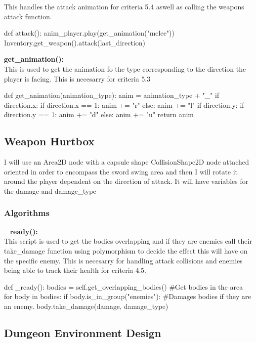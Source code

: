 \documentclass{article}
\begin{document}
        This handles the attack animation for criteria 5.4 aswell as calling the weapons attack function.\\
        \begin{python}
def attack():
   anim_player.play(get_animation("melee"))
   Inventory.get_weapon().attack(last_direction)
        \end{python}
        \textbf{get\_animation():}\\
        This is used to get the animation fo the type corresponding to the direction the player is facing. This is necesarry for criteria 5.3\\
        \begin{python}
def get_animation(animation_type):
   anim = animation_type + "_"
   if direction.x:
      if direction.x == 1:
         anim += "r"
      else:
         anim += "l"
   if direction.y:
      if direction.y == 1:
         anim += "d"
      else:
         anim += "u"
   return anim
        \end{python}
        \subsection{Weapon Hurtbox}
        I will use an Area2D node with a capsule shape CollisionShape2D node attached oriented in order to encompass the sword swing area and then I will rotate it around the player dependent on the direction of attack. It will have variables for the damage and damage\_type\\
        \subsubsection{Algorithms}
        \textbf{\_ready():}\\
        This script is used to get the bodies overlapping and if they are enemies call their take\_damage function using polymorphism to decide the effect this will have on the specific enemy. This is necesarry for handling attack collisions and enemies being able to track their health for criteria 4.5.\\ 
        \begin{python}
def _ready():
   bodies = self.get_overlapping_bodies() #Get bodies in the area
   for body in bodies:
      if body.is_in_group("enemies"): #Damages bodies if they are an enemy.
         body.take_damage(damage, damage_type)
        \end{python}
        \subsection{Dungeon Environment Design}
\end{document}
